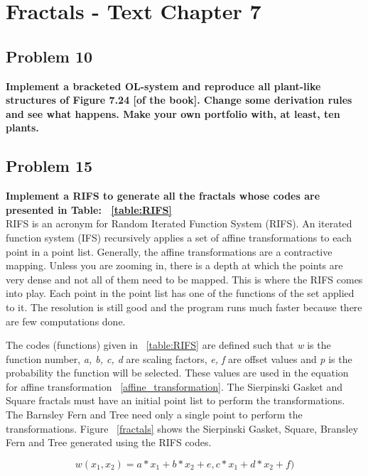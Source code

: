 
\chapter{Fractals - Text Chapter 7}

\section{Problem 10}
\textbf{ Implement a bracketed OL-system and reproduce all plant-like structures of Figure 7.24 [of the book]. Change some derivation rules and see what happens. Make your own portfolio with, at least, ten plants. }

\section{Problem 15}
\textbf{ Implement a RIFS to generate all the fractals whose codes are presented in Table: ~\ref{table:RIFS} } \\
\newline
RIFS is an acronym for Random Iterated Function System (RIFS). An iterated function system (IFS) recursively applies a set of affine transformations to each point in a point list. Generally, the affine transformations are a contractive mapping.  Unless you are zooming in, there is a depth at which the points are very dense and not all of them need to be mapped. This is where the RIFS comes into play. Each point in the point list has one of the functions of the set applied to it. The resolution is still good and the program runs much faster because there are few computations done. 

The codes (functions) given in ~\ref{table:RIFS} are defined such that \textit{w} is the function number, \textit{a, b, c, d} are scaling factors, \textit{e, f} are offset values and \textit{p} is the probability the function will be selected. These values are used in the equation for affine transformation ~\ref{affine_transformation}. The Sierpinski Gasket and Square fractals must have an initial point list to perform the transformations. The Barnsley Fern and Tree need only a single point to perform the transformations. Figure ~\ref{fractals} shows the Sierpinski Gasket, Square, Bransley Fern and Tree generated using the RIFS codes. 

\begin{equation}
w(x_1 , x_2) = a*x_1 + b*x_2 + e, c*x_1 + d*x_2 + f )
\end{equation} \label{affine_transformation}

